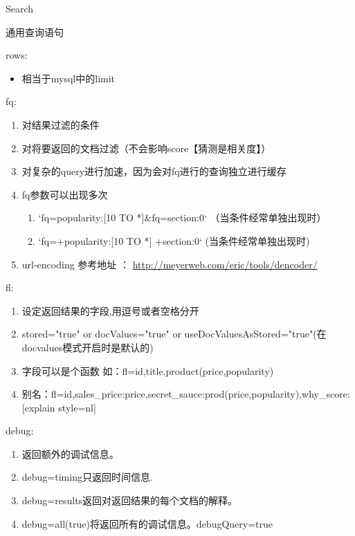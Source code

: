 \documentclass[presentation]{beamer}
\begin{document}
\begin{frame}[fragile,label={sec:org1ccf379}]{Search}
\begin{block}{通用查询语句}
\begin{block}{rows:}
\begin{itemize}
\item 相当于mysql中的limit
\end{itemize}
\end{block}

\begin{block}{fq:}
\begin{enumerate}
\item 对结果过滤的条件
\item 对将要返回的文档过滤（不会影响score【猜测是相关度】）
\item 对复杂的query进行加速，因为会对fq进行的查询独立进行缓存
\item fq参数可以出现多次
\begin{enumerate}
\item `fq=popularity:[10 TO *]\&fq=section:0` （当条件经常单独出现时）
\item `fq=+popularity:[10 TO *] +section:0` (当条件经常单独出现时)
\end{enumerate}
\item url-encoding 参考地址 ：  \url{http://meyerweb.com/eric/tools/dencoder/}
\end{enumerate}
\end{block}

\begin{block}{fl:}
\begin{enumerate}
\item 设定返回结果的字段,用逗号或者空格分开
\item stored="true" or docValues="true" or useDocValuesAsStored="true"(在docvalues模式开启时是默认的)
\item 字段可以是个函数 如：fl=id,title,product(price,popularity)
\item 别名：fl=id,sales\_price:price,secret\_sauce:prod(price,popularity),why\_score:[explain style=nl]
\end{enumerate}
\end{block}

\begin{block}{debug:}
\begin{enumerate}
\item 返回额外的调试信息。
\item debug=timing只返回时间信息.
\item debug=results返回对返回结果的每个文档的解释。
\item debug=all(true)将返回所有的调试信息。debugQuery=true
\end{enumerate}
\end{block}


\end{block}
\end{frame}
\end{document}
